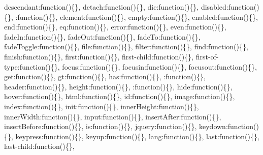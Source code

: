 {\begin{DoxyParamCaption}
\textquotesingle{}descendant\textquotesingle{}\+:function()\{\}, \textquotesingle{}detach\textquotesingle{}\+:function()\{\}, \textquotesingle{}die\textquotesingle{}\+:function()\{\}, \textquotesingle{}disabled\textquotesingle{}\+:function()\{\}, \textquotesingle{}\+:function()\{\}, \textquotesingle{}element\textquotesingle{}\+:function()\{\}, \textquotesingle{}empty\textquotesingle{}\+:function()\{\}, \textquotesingle{}enabled\textquotesingle{}\+:function()\{\}, \textquotesingle{}end\textquotesingle{}\+:function()\{\}, \textquotesingle{}eq\textquotesingle{}\+:function()\{\}, \textquotesingle{}error\textquotesingle{}\+:function()\{\}, \textquotesingle{}even\textquotesingle{}\+:function()\{\}, \textquotesingle{}fade\+In\textquotesingle{}\+:function()\{\}, \textquotesingle{}fade\+Out\textquotesingle{}\+:function()\{\}, \textquotesingle{}fade\+To\textquotesingle{}\+:function()\{\}, \textquotesingle{}fade\+Toggle\textquotesingle{}\+:function()\{\}, \textquotesingle{}file\textquotesingle{}\+:function()\{\}, \textquotesingle{}filter\textquotesingle{}\+:function()\{\}, \textquotesingle{}find\textquotesingle{}\+:function()\{\}, \textquotesingle{}finish\textquotesingle{}\+:function()\{\}, \textquotesingle{}first\textquotesingle{}\+:function()\{\}, \textquotesingle{}first-\/child\textquotesingle{}\+:function()\{\}, \textquotesingle{}first-\/of-\/type\textquotesingle{}\+:function()\{\}, \textquotesingle{}focus\textquotesingle{}\+:function()\{\}, \textquotesingle{}focusin\textquotesingle{}\+:function()\{\}, \textquotesingle{}focusout\textquotesingle{}\+:function()\{\}, \textquotesingle{}get\textquotesingle{}\+:function()\{\}, \textquotesingle{}gt\textquotesingle{}\+:function()\{\}, \textquotesingle{}has\textquotesingle{}\+:function()\{\}, \textquotesingle{}\+:function()\{\}, \textquotesingle{}header\textquotesingle{}\+:function()\{\}, \textquotesingle{}height\textquotesingle{}\+:function()\{\}, \textquotesingle{}\+:function()\{\}, \textquotesingle{}hide\textquotesingle{}\+:function()\{\}, \textquotesingle{}hover\textquotesingle{}\+:function()\{\}, \textquotesingle{}html\textquotesingle{}\+:function()\{\}, \textquotesingle{}id\textquotesingle{}\+:function()\{\}, \textquotesingle{}image\textquotesingle{}\+:function()\{\}, \textquotesingle{}index\textquotesingle{}\+:function()\{\}, \textquotesingle{}init\textquotesingle{}\+:function()\{\}, \textquotesingle{}inner\+Height\textquotesingle{}\+:function()\{\}, \textquotesingle{}inner\+Width\textquotesingle{}\+:function()\{\}, \textquotesingle{}input\textquotesingle{}\+:function()\{\}, \textquotesingle{}insert\+After\textquotesingle{}\+:function()\{\}, \textquotesingle{}insert\+Before\textquotesingle{}\+:function()\{\}, \textquotesingle{}is\textquotesingle{}\+:function()\{\}, \textquotesingle{}jquery\textquotesingle{}\+:function()\{\}, \textquotesingle{}keydown\textquotesingle{}\+:function()\{\}, \textquotesingle{}keypress\textquotesingle{}\+:function()\{\}, \textquotesingle{}keyup\textquotesingle{}\+:function()\{\}, \textquotesingle{}lang\textquotesingle{}\+:function()\{\}, \textquotesingle{}last\textquotesingle{}\+:function()\{\}, \textquotesingle{}last-\/child\textquotesingle{}\+:function()\{\}, 
\end{DoxyParamCaption}}
